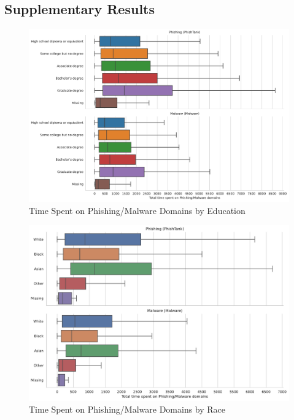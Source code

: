 \documentclass[12pt, letterpaper]{article}
\begin{document}
\clearpage
\subsection{Supplementary Results}

\begin{figure}[!htb]
  \centering
  \caption{Time Spent on Phishing/Malware Domains by Education}
	\label{fig:total_time_phishing_malware_educ}
	\includegraphics[width=\textwidth]{../figs/total_time_phishing_malware_educ.pdf}
\end{figure}

\begin{figure}[!htb]
  \centering
  \caption{Time Spent on Phishing/Malware Domains by Race}
	\label{fig:prop_total_time_phishing_malware_race}
	\includegraphics[width=\textwidth]{../figs/total_time_phishing_malware_race.pdf}
	\end{figure}
\end{document}

